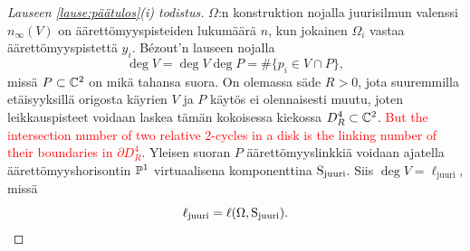 \begin{proof}[Lauseen \ref{lause:päätulos}(i) todistus]
    $\Omega$:n konstruktion nojalla juurisilmun valenssi $n_\infty(V)$ on äärettömyyspisteiden lukumäärä $n$, kun jokainen $\Omega_i$ vastaa äärettömyyspistettä $y_i$. Bézout'n lauseen nojalla
    \begin{equation*}
        \deg V=\deg V\deg P=\#\{p_i\in V\cap P\},
    \end{equation*}
    missä $P\subset\C^2$ on mikä tahansa suora. On olemassa säde $R>0$, jota suuremmilla etäisyyksillä origosta käyrien $V$ ja $P$ käytös ei olennaisesti muutu, joten leikkauspisteet voidaan laskea tämän kokoisessa kiekossa $D_R^4\subset\C^2$. \textcolor{red}{But the intersection number of two relative 2-cycles in a disk is the linking number of their boundaries in $\partial D_R^4$}. Yleisen suoran $P$ äärettömyyslinkkiä voidaan ajatella äärettömyyshorisontin $\P^1$ virtuaalisena komponenttina $\solmu_\text{juuri}$. Siis $\deg V=\ell_\text{juuri}$, missä 
    \begin{equation*}
        \ell_\text{juuri}=\ell(\Omega,\solmu_\text{juuri}).
    \end{equation*}
\end{proof}
